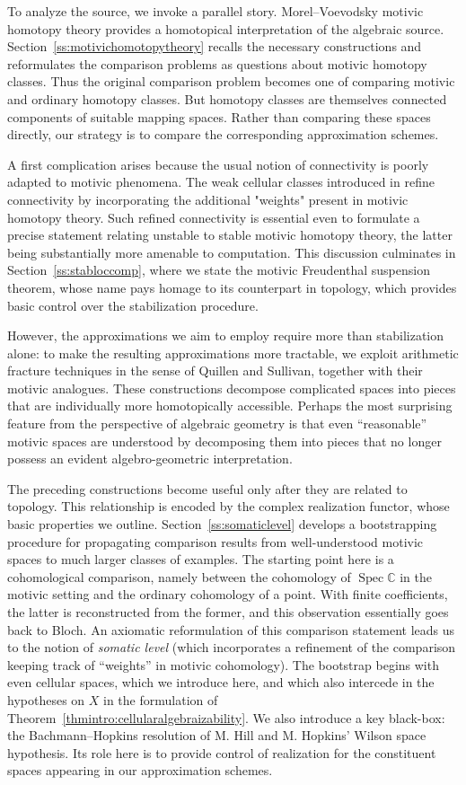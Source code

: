 \documentclass[11pt,leqno]{article}
\newcommand{\Spec}{\operatorname{Spec}}
\newcommand{\cplx}{{\mathbb C}}
\renewcommand{\1}{{\rm 1\hspace*{-0.4ex}%
\rule{0.1ex}{1.52ex}\hspace*{0.2ex}}}
\newcommand{\<}[1]{{\langle}#1 {\rangle}}
\newcounter{intro}
\theoremstyle{plain}
\theoremstyle{definition}
\theoremstyle{remark}
\numberwithin{equation}{subsection}
\begin{document}
To analyze the source, we invoke a parallel story. Morel--Voevodsky motivic homotopy theory provides a homotopical interpretation of the algebraic source. Section~\ref{ss:motivichomotopytheory} recalls the necessary constructions and reformulates the comparison problems as questions about motivic homotopy classes.  Thus the original comparison problem becomes one of comparing motivic and ordinary homotopy classes.  But homotopy classes are themselves connected components of suitable mapping spaces. Rather than comparing these spaces directly, our strategy is to compare the corresponding approximation schemes.

A first complication arises because the usual notion of connectivity is poorly adapted to motivic phenomena. The weak cellular classes introduced in \cite{ABHFreudenthal} refine connectivity by incorporating the additional "weights" present in motivic homotopy theory.  Such refined connectivity is essential even to formulate a precise statement relating unstable to stable motivic homotopy theory, the latter being substantially more amenable to computation.  This discussion culminates in Section~\ref{ss:stabloccomp}, where we state the motivic Freudenthal suspension theorem, whose name pays homage to its counterpart in topology, which provides basic control over the stabilization procedure.

However, the approximations we aim to employ require more than stabilization alone: to make the resulting approximations more tractable, we exploit arithmetic fracture techniques in the sense of Quillen and Sullivan, together with their motivic analogues.  These constructions decompose complicated spaces into pieces that are individually more homotopically accessible.  Perhaps the most surprising feature from the perspective of algebraic geometry is that even ``reasonable'' motivic spaces are understood by decomposing them into pieces that no longer possess an evident algebro-geometric interpretation.

The preceding constructions become useful only after they are related to topology. This relationship is encoded by the complex realization functor, whose basic properties we outline.  Section~\ref{ss:somaticlevel} develops a bootstrapping procedure for propagating comparison results from well-understood motivic spaces to much larger classes of examples.  The starting point here is a cohomological comparison, namely between the cohomology of $\Spec \cplx$ in the motivic setting and the ordinary cohomology of a point.  With finite coefficients, the latter is reconstructed from the former, and this observation essentially goes back to Bloch.  An axiomatic reformulation of this comparison statement leads us to the notion of {\em somatic level} (which incorporates a refinement of the comparison keeping track of ``weights'' in motivic cohomology).  The bootstrap begins with even cellular spaces, which we introduce here, and which also intercede in the hypotheses on $X$ in the formulation of Theorem~\ref{thmintro:cellularalgebraizability}.  We also introduce a key black-box: the Bachmann--Hopkins resolution of M. Hill and M. Hopkins' Wilson space hypothesis.  Its role here is to provide control of realization for the constituent spaces appearing in our approximation schemes.
\end{document}
